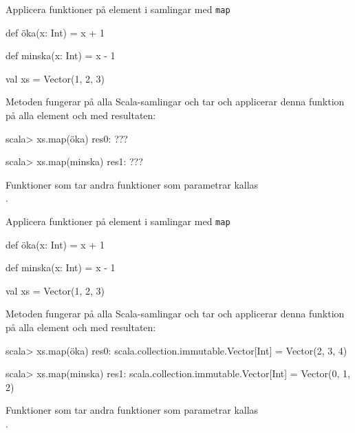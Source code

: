 \begin{Slide}{Applicera funktioner på element i samlingar med \texttt{map}}\SlideFontSmall
\begin{Code}
def öka(x: Int) = x + 1

def minska(x: Int) = x - 1

val xs = Vector(1, 2, 3)
\end{Code}
\pause
Metoden  fungerar på alla Scala-samlingar och tar  och applicerar denna funktion på alla element och  med resultaten:
\begin{REPL}
scala> xs.map(öka)
res0: ???

scala> xs.map(minska)
res1: ???
\end{REPL}
Funktioner som tar andra funktioner som parametrar kallas \\ .
\end{Slide}


\begin{Slide}{Applicera funktioner på element i samlingar med \texttt{map}}\SlideFontSmall
\begin{Code}
def öka(x: Int) = x + 1

def minska(x: Int) = x - 1

val xs = Vector(1, 2, 3)
\end{Code}
Metoden  fungerar på alla Scala-samlingar och tar  och applicerar denna funktion på alla element och  med resultaten:
\begin{REPL}
scala> xs.map(öka)
res0: scala.collection.immutable.Vector[Int] = Vector(2, 3, 4)

scala> xs.map(minska)
res1: scala.collection.immutable.Vector[Int] = Vector(0, 1, 2)
\end{REPL}
Funktioner som tar andra funktioner som parametrar kallas \\ .
\end{Slide}




